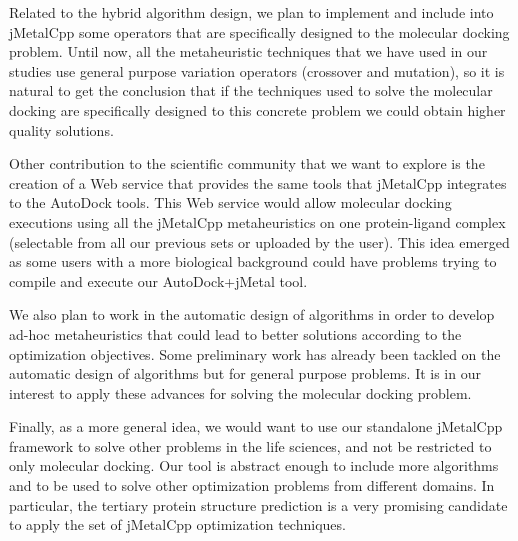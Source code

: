 Related to the hybrid algorithm design, we plan to implement and include into jMetalCpp some operators that are specifically designed to the molecular docking problem. Until now, all the metaheuristic techniques that we have used in our studies use general purpose variation operators (crossover and mutation), so it is natural to get the conclusion that if the techniques used to solve the molecular docking are specifically designed to this concrete problem we could obtain higher quality solutions.

Other contribution to the scientific community that we want to explore is the creation of a Web service that provides the same tools that jMetalCpp integrates to the AutoDock tools. This Web service would allow molecular docking executions using all the jMetalCpp metaheuristics on one protein-ligand complex (selectable from all our previous sets or uploaded by the user). This idea emerged as some users with a more biological background could have problems trying to compile and execute our AutoDock+jMetal tool.

We also plan to work in the automatic design of algorithms in order to develop ad-hoc metaheuristics that could lead to better solutions according to the optimization objectives. Some preliminary work has already been tackled on the automatic design of algorithms but for general purpose problems. It is in our interest to apply these advances for solving the molecular docking problem.

Finally, as a more general idea, we would want to use our standalone jMetalCpp framework to solve other problems in the life sciences, and not be restricted to only molecular docking. Our tool is  abstract enough to include more algorithms and to be used to solve other optimization problems from different domains. In particular, the tertiary protein structure prediction is a very promising candidate to apply the set of jMetalCpp optimization techniques.

